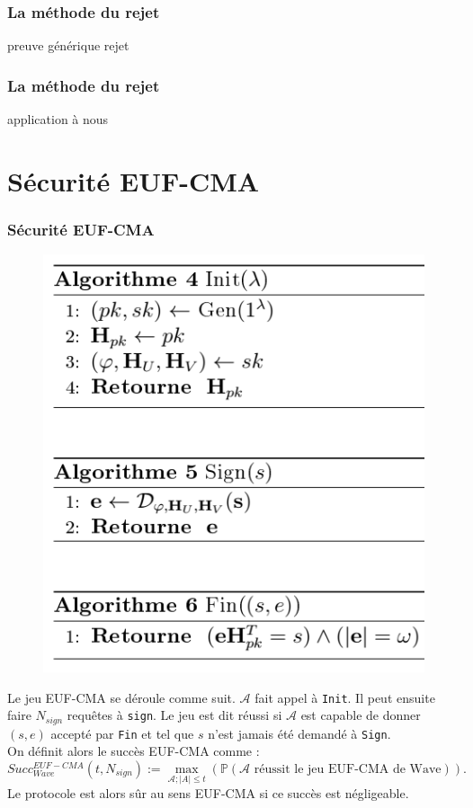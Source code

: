 \documentclass[10pt,a4paper]{beamer}
\theoremstyle{plain}
\theoremstyle{definition}
\begin{document}
\begin{frame}
\frametitle{La méthode du rejet}
preuve générique rejet
\end{frame}

\begin{frame}
\frametitle{La méthode du rejet}
application à nous
\end{frame}

\section{Sécurité EUF-CMA}

\begin{frame}[fragile]
\frametitle{Sécurité EUF-CMA}	
\begin{figure}[h]
		\includegraphics[scale=0.35]{eufcma.png}
\end{figure}
\end{frame}


\begin{frame}[fragile]
\noindent Le jeu EUF-CMA se déroule comme suit. $\mathcal{A}$ fait appel à \verb|Init|. Il peut ensuite faire $N_{sign}$ requêtes à \verb|sign|. Le jeu est dit réussi si $\mathcal{A}$ est capable de donner $(s,e)$ accepté par \verb|Fin| et tel que $s$ n'est jamais été demandé à \verb|Sign|. \\
On définit alors le succès EUF-CMA comme :
$$Succ^{EUF-CMA}_{Wave}(t,N_{sign}) := \max_{\mathcal{A};|A|\leq t}(\mathbb{P}(\mathcal{A}\text{ réussit le jeu EUF-CMA de Wave})).$$
Le protocole est alors sûr au sens EUF-CMA si ce succès est négligeable. \\
\end{frame}
\end{document}
